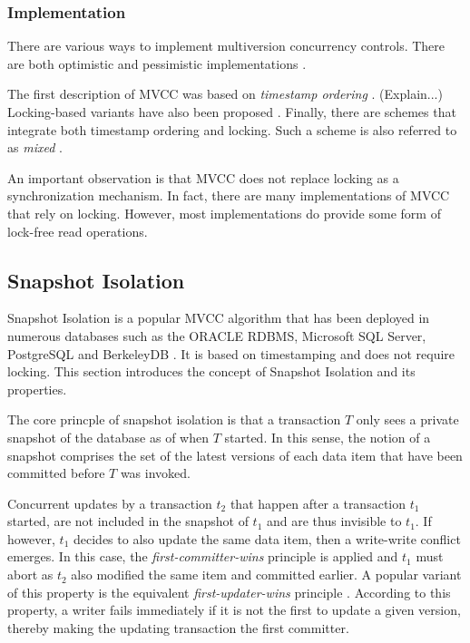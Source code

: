 \subsubsection{Implementation}

There are various ways to implement multiversion concurrency controls. There are
both optimistic and pessimistic implementations \cite{kung1981optimistic}.

The first description of MVCC was based on \textit{timestamp ordering}
\cite{reed1978naming}. (Explain...) Locking-based variants have also been
proposed \cite{bayer1980parallelism, bayer1980distributed,
stearns1981distributed}. Finally, there are schemes that integrate both
timestamp ordering and locking. Such a scheme is also referred to as
\textit{mixed} \cite{bernstein1983multiversion}.

An important observation is that MVCC does not replace locking as a
synchronization mechanism. In fact, there are many implementations of MVCC that
rely on locking. However, most implementations do provide some form of lock-free
read operations.

\subsection{Snapshot Isolation}

Snapshot Isolation \cite{berenson1995critique} is a popular MVCC algorithm that
has been deployed in numerous databases such as the ORACLE RDBMS, Microsoft SQL
Server, PostgreSQL and BerkeleyDB \cite{cahill2009serializable}. It is based on
timestamping and does not require locking. This section introduces the concept
of Snapshot Isolation and its properties.

The core princple of snapshot isolation is that a transaction $T$ only sees a
private snapshot of the database as of when $T$ started. In this sense, the
notion of a snapshot comprises the set of the latest versions of each data item
that have been committed before $T$ was invoked.

Concurrent updates by a transaction $t_2$ that happen after a transaction $t_1$
started, are not included in the snapshot of $t_1$ and are thus invisible to
$t_1$. If however, $t_1$ decides to also update the same data item, then a
write-write conflict emerges. In this case, the \textit{first-committer-wins}
principle is applied and $t_1$ must abort as $t_2$ also modified the same item
and committed earlier. A popular variant of this property is the equivalent
\textit{first-updater-wins} principle \cite{fekete2004read, larson2011high}.
According to this property, a writer fails immediately if it is not the first to
update a given version, thereby making the updating transaction the first
committer.

